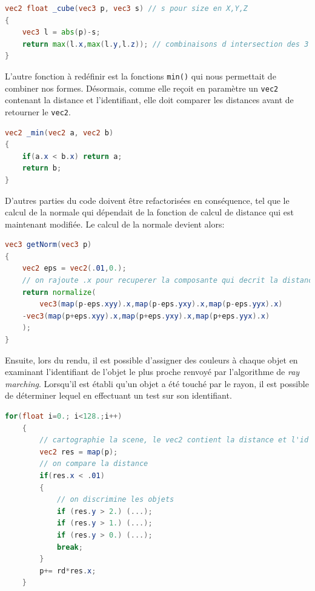 \begin{minipage}{\linewidth}
\begin{lstlisting}[language=GLSL, caption=SDF avec id,captionpos=b,frame=single]
vec2 float _cube(vec3 p, vec3 s) // s pour size en X,Y,Z
{
    vec3 l = abs(p)-s;
    return max(l.x,max(l.y,l.z)); // combinaisons d intersection des 3 axes
}
\end{lstlisting}
\end{minipage}

L'autre fonction à redéfinir est la fonctions \lstinline{min()} qui nous permettait de combiner nos formes. Désormais, comme elle reçoit en paramètre un \lstinline{vec2} contenant la distance et l'identifiant, elle doit comparer les distances avant de retourner le \lstinline{vec2}.

\begin{minipage}{\linewidth}
\begin{lstlisting}[language=GLSL, caption=Nouvelle fonction \lstinline{min()},captionpos=b,frame=single] 
vec2 _min(vec2 a, vec2 b)
{
    if(a.x < b.x) return a;
    return b;
}
\end{lstlisting}
\end{minipage}

D'autres parties du code doivent être refactorisées en conséquence, tel que le calcul de la normale qui dépendait de la fonction de calcul de distance qui est maintenant modifiée. Le calcul de la normale devient alors:

\begin{minipage}{\linewidth}
\begin{lstlisting}[language=GLSL, caption=Nouvelle fonction \lstinline{getNorm()},captionpos=b,frame=single] 
vec3 getNorm(vec3 p)
{
    vec2 eps = vec2(.01,0.);
    // on rajoute .x pour recuperer la composante qui decrit la distance
    return normalize(
        vec3(map(p-eps.xyy).x,map(p-eps.yxy).x,map(p-eps.yyx).x)
    -vec3(map(p+eps.xyy).x,map(p+eps.yxy).x,map(p+eps.yyx).x)
    );
}
\end{lstlisting}
\end{minipage}

Ensuite, lors du rendu, il est possible d'assigner des couleurs à chaque objet en examinant l'identifiant de l'objet le plus proche renvoyé par l'algorithme de  \textit{ray marching}. Lorsqu'il est établi qu'un objet a été touché par le rayon, il est possible de déterminer lequel en effectuant un test sur son identifiant.

\begin{minipage}{\linewidth}
\begin{lstlisting}[language=GLSL, caption=Discriminer les objets avec l'id dans le  \textit{ray marching},captionpos=b,frame=single] 
for(float i=0.; i<128.;i++)
    {
        // cartographie la scene, le vec2 contient la distance et l'id des objets de la scene
        vec2 res = map(p); 
        // on compare la distance
        if(res.x < .01)
        {            
            // on discrimine les objets
            if (res.y > 2.) (...);
            if (res.y > 1.) (...);
            if (res.y > 0.) (...);
            break;
        }
        p+= rd*res.x;  
    }
\end{lstlisting}
\end{minipage}

